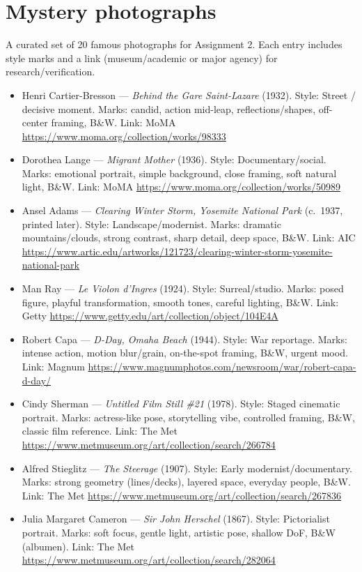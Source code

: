\documentclass[12pt]{article}
\begin{document}
\section*{Mystery photographs}
A curated set of 20 famous photographs for Assignment 2. Each entry includes style marks and a link (museum/academic or major agency) for research/verification.

\begin{itemize}
  \item Henri Cartier-Bresson — \emph{Behind the Gare Saint-Lazare} (1932). Style: Street / decisive moment. Marks: candid, action mid-leap, reflections/shapes, off-center framing, B\&W. Link: MoMA \url{https://www.moma.org/collection/works/98333}
  \item Dorothea Lange — \emph{Migrant Mother} (1936). Style: Documentary/social. Marks: emotional portrait, simple background, close framing, soft natural light, B\&W. Link: MoMA \url{https://www.moma.org/collection/works/50989}
  \item Ansel Adams — \emph{Clearing Winter Storm, Yosemite National Park} (c.\ 1937, printed later). Style: Landscape/modernist. Marks: dramatic mountains/clouds, strong contrast, sharp detail, deep space, B\&W. Link: AIC \url{https://www.artic.edu/artworks/121723/clearing-winter-storm-yosemite-national-park}
  \item Man Ray — \emph{Le Violon d’Ingres} (1924). Style: Surreal/studio. Marks: posed figure, playful transformation, smooth tones, careful lighting, B\&W. Link: Getty \url{https://www.getty.edu/art/collection/object/104E4A}
  \item Robert Capa — \emph{D-Day, Omaha Beach} (1944). Style: War reportage. Marks: intense action, motion blur/grain, on-the-spot framing, B\&W, urgent mood. Link: Magnum \url{https://www.magnumphotos.com/newsroom/war/robert-capa-d-day/}
  \item Cindy Sherman — \emph{Untitled Film Still \#21} (1978). Style: Staged cinematic portrait. Marks: actress-like pose, storytelling vibe, controlled framing, B\&W, classic film reference. Link: The Met \url{https://www.metmuseum.org/art/collection/search/266784}
  \item Alfred Stieglitz — \emph{The Steerage} (1907). Style: Early modernist/documentary. Marks: strong geometry (lines/decks), layered space, everyday people, B\&W. Link: The Met \url{https://www.metmuseum.org/art/collection/search/267836}
  \item Julia Margaret Cameron — \emph{Sir John Herschel} (1867). Style: Pictorialist portrait. Marks: soft focus, gentle light, artistic pose, shallow DoF, B\&W (albumen). Link: The Met \url{https://www.metmuseum.org/art/collection/search/282064}

\end{itemize}
\end{document}
